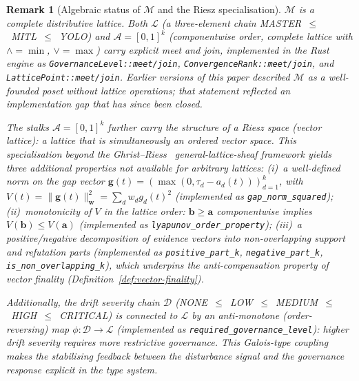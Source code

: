 \documentclass[11pt]{article}
\newtheorem{remark}{Remark}
\begin{document}
\begin{remark}[Algebraic status of $\mathcal{M}$ and the Riesz specialisation]
\label{rem:algebraic-status}
$\mathcal{M}$ is a \emph{complete distributive lattice}. Both $\mathcal{L}$ (a three-element chain MASTER~$\leq$~MITL~$\leq$~YOLO) and $\mathcal{A} = [0,1]^k$ (componentwise order, complete lattice with $\wedge = \min$, $\vee = \max$) carry explicit meet and join, implemented in the Rust engine as \texttt{GovernanceLevel::meet/join}, \texttt{ConvergenceRank::meet/join}, and \texttt{LatticePoint::meet/join}. Earlier versions of this paper described $\mathcal{M}$ as a well-founded poset without lattice operations; that statement reflected an implementation gap that has since been closed.

The stalks $\mathcal{A} = [0,1]^k$ further carry the structure of a \emph{Riesz space} (vector lattice): a lattice that is simultaneously an ordered vector space. This specialisation beyond the Ghrist--Riess~\cite{ghrist2022} general-lattice-sheaf framework yields three additional properties not available for arbitrary lattices: (i)~a well-defined \emph{norm} on the gap vector $\mathbf{g}(t) = (\max(0,\tau_d - a_d(t)))_{d=1}^k$, with $V(t) = \|\mathbf{g}(t)\|^2_\mathbf{w} = \sum_d w_d g_d(t)^2$ (implemented as \texttt{gap\_norm\_squared}); (ii)~monotonicity of $V$ in the lattice order: $\mathbf{b} \geq \mathbf{a}$ componentwise implies $V(\mathbf{b}) \leq V(\mathbf{a})$ (implemented as \texttt{lyapunov\_order\_property}); (iii)~a \emph{positive/negative decomposition} of evidence vectors into non-overlapping support and refutation parts (implemented as \texttt{positive\_part\_k}, \texttt{negative\_part\_k}, \texttt{is\_non\_overlapping\_k}), which underpins the anti-compensation property of vector finality (Definition~\ref{def:vector-finality}).

Additionally, the drift severity chain $\mathcal{D}$ (NONE~$\leq$~LOW~$\leq$~MEDIUM~$\leq$~HIGH~$\leq$~CRITICAL) is connected to $\mathcal{L}$ by an anti-monotone (order-reversing) map $\phi: \mathcal{D} \to \mathcal{L}$ (implemented as \texttt{required\_governance\_level}): higher drift severity requires more restrictive governance. This Galois-type coupling makes the stabilising feedback between the disturbance signal and the governance response explicit in the type system.
\end{remark}
\end{document}
